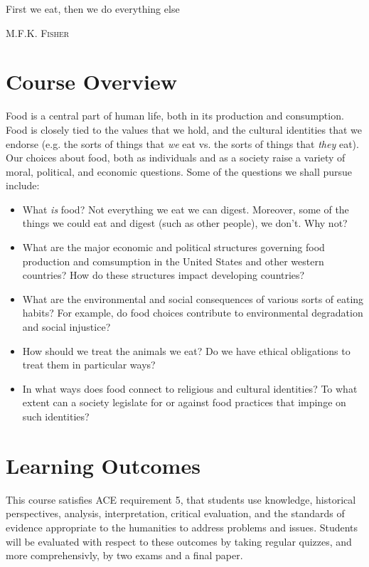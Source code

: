 \documentclass[12pt]{article}
\begin{document}
  \bigskip
  \bigskip


  \bigskip

  \epigraph{First we eat, then we do everything else}{\textsc{M.F.K. Fisher}}
  \smallskip    

  \section*{Course Overview} 
  Food is a central part of human life, both in its production and consumption. Food is closely tied to the values that we hold, and the cultural identities that we endorse (e.g. the sorts of things that \emph{we} eat vs. the sorts of things that \emph{they} eat). Our choices about food, both as individuals and as a society raise a variety of moral, political, and economic questions. Some of the questions we shall pursue include:

  \begin{itemize}
  \item What \emph{is} food? Not everything we eat we can digest. Moreover, some
of the things we could eat and digest (such as other people), we don't. Why not?
  \item What are the major economic and political structures governing food
    production and comsumption in the United States and other western countries?
    How do these structures impact developing countries?
  \item What are the environmental and social consequences of various sorts of eating habits? For example, do food choices contribute to environmental degradation and social injustice?
  \item How should we treat the animals we eat? Do we have ethical obligations to treat them in particular ways?
  \item In what ways does food connect to religious and cultural identities? To
    what extent can a society legislate for or against food practices that
    impinge on such identities? 
  \end{itemize}

  \section*{Learning Outcomes} 
  This course satisfies ACE requirement 5, that students use knowledge,
  historical perspectives, analysis, interpretation, critical evaluation, and
  the standards of evidence appropriate to the humanities to address problems
  and issues. Students will be evaluated with respect to these outcomes by
  taking regular quizzes, and more comprehensivly, by two exams and a final paper.
\end{document}
